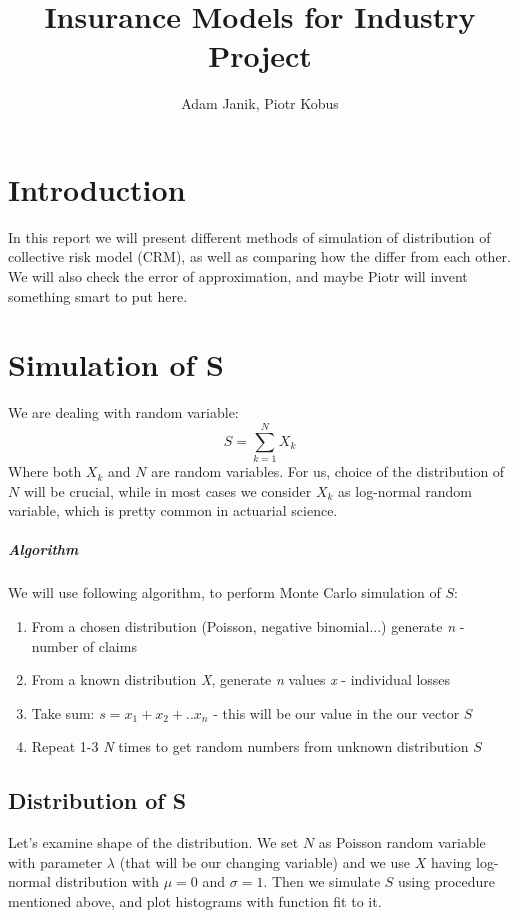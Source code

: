 \documentclass{article}
\title{Insurance Models for Industry Project}
\author{Adam Janik, Piotr Kobus}
\begin{document}
	\maketitle
	\newpage
	
\section{Introduction}
In this report we will present different methods of simulation of distribution of collective risk model (CRM), as well as comparing how the differ from each other. We will also check the error of approximation, and maybe Piotr will invent something smart to put here.
\section{Simulation of S}
We are dealing with random variable:
\begin{equation*}
S = \sum_{k=1}^N X_k
\end{equation*}
Where both $X_k$ and $N$ are random variables. For us, choice of the distribution of $N$ will be crucial, while in most cases we consider $X_k$ as log-normal random variable, which is pretty common in actuarial science.
\subparagraph{Algorithm}
We will use following algorithm, to perform Monte Carlo simulation of $S$:\\
\begin{enumerate}
\item From a chosen distribution (Poisson, negative binomial...) generate \textit{n} - number of claims
\item From a known distribution \textit{X}, generate \textit{n} values \textit{x} - individual losses
\item Take sum: $s = x_1 + x_2 + .. x_n$ - this will be our value in the our vector $S$
\item Repeat 1-3 \textit{N} times to get random numbers from unknown distribution $S$
\end{enumerate}

\subsection{Distribution of S}
Let's examine shape of the distribution. We set $N$ as Poisson random variable with parameter $\lambda$ (that will be our changing variable) and we use $X$ having log-normal distribution with $\mu = 0$ and $\sigma = 1$. Then we simulate $S$ using procedure mentioned above, and plot histograms with function fit to it.
\end{document}
